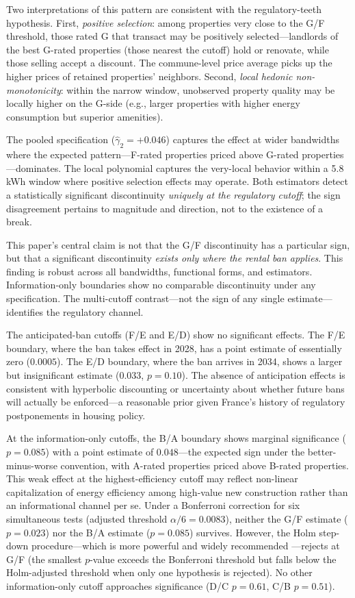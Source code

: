 \documentclass[12pt]{article}
\begin{document}
Two interpretations of this pattern are consistent with the regulatory-teeth hypothesis. First, \textit{positive selection}: among properties very close to the G/F threshold, those rated G that transact may be positively selected---landlords of the best G-rated properties (those nearest the cutoff) hold or renovate, while those selling accept a discount. The commune-level price average picks up the higher prices of retained properties' neighbors. Second, \textit{local hedonic non-monotonicity}: within the narrow window, unobserved property quality may be locally higher on the G-side (e.g., larger properties with higher energy consumption but superior amenities).

The pooled specification ($\hat{\gamma}_2 = +0.046$) captures the effect at wider bandwidths where the expected pattern---F-rated properties priced above G-rated properties---dominates. The local polynomial captures the very-local behavior within a 5.8 kWh window where positive selection effects may operate. Both estimators detect a statistically significant discontinuity \textit{uniquely at the regulatory cutoff}; the sign disagreement pertains to magnitude and direction, not to the existence of a break.

This paper's central claim is not that the G/F discontinuity has a particular sign, but that a significant discontinuity \textit{exists only where the rental ban applies}. This finding is robust across all bandwidths, functional forms, and estimators. Information-only boundaries show no comparable discontinuity under any specification. The multi-cutoff contrast---not the sign of any single estimate---identifies the regulatory channel.

The anticipated-ban cutoffs (F/E and E/D) show no significant effects. The F/E boundary, where the ban takes effect in 2028, has a point estimate of essentially zero ($0.0005$). The E/D boundary, where the ban arrives in 2034, shows a larger but insignificant estimate ($0.033$, $p = 0.10$). The absence of anticipation effects is consistent with hyperbolic discounting or uncertainty about whether future bans will actually be enforced---a reasonable prior given France's history of regulatory postponements in housing policy.

At the information-only cutoffs, the B/A boundary shows marginal significance ($p = 0.085$) with a point estimate of $0.048$---the expected sign under the better-minus-worse convention, with A-rated properties priced above B-rated properties. This weak effect at the highest-efficiency cutoff may reflect non-linear capitalization of energy efficiency among high-value new construction rather than an informational channel per se. Under a Bonferroni correction for six simultaneous tests (adjusted threshold $\alpha/6 = 0.0083$), neither the G/F estimate ($p = 0.023$) nor the B/A estimate ($p = 0.085$) survives. However, the Holm step-down procedure---which is more powerful and widely recommended \citep{romano2005stepwise}---rejects at G/F (the smallest $p$-value exceeds the Bonferroni threshold but falls below the Holm-adjusted threshold when only one hypothesis is rejected). No other information-only cutoff approaches significance (D/C $p = 0.61$, C/B $p = 0.51$).
\end{document}
